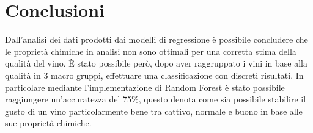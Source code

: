 \documentclass[12pt]{article}
\begin{document}
\section{Conclusioni}
Dall'analisi dei dati prodotti dai modelli di regressione è possibile concludere che le proprietà chimiche in analisi non sono ottimali per una corretta stima della qualità del vino. È stato possibile però, dopo aver raggruppato i vini in base alla qualità in 3 macro gruppi, effettuare una classificazione con discreti risultati. In particolare mediante l'implementazione di Random Forest è stato possibile raggiungere un'accuratezza del 75\%, questo denota come sia possibile stabilire il gusto di un vino particolarmente bene tra cattivo, normale e buono in base alle sue proprietà chimiche.
\end{document}
